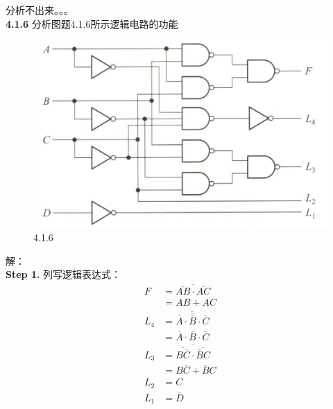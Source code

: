 \documentclass[a4paper,11pt,UTF8]{article}
\begin{document}
分析不出来。。。\\

\textbf{4.1.6} 分析图题4.1.6所示逻辑电路的功能\\
\begin{figure}[H]
	\centering
	\includegraphics[scale=0.15]{SD4.1.6}
	\caption{4.1.6}
\end{figure}
\noindent 解：\\

\textbf{Step 1.} 列写逻辑表达式：
$$\begin{aligned}
	F&=\overline{\overline{AB}\cdot\overline{AC}}\\
	&=AB+AC\\
	L_4&=\overline{\overline{\overline{A}\cdot\overline{B}\cdot\overline{C}}}\\&=\overline{A}\cdot\overline{B}\cdot\overline{C}\\
	L_3&=\overline{\overline{B\overline{C}}\cdot\overline{\overline{B}C}}\\
	&=B\overline{C}+\overline{B}C\\
	L_2&=C\\
	L_1&=\overline{D}\\
\end{aligned}
$$
\end{document}
